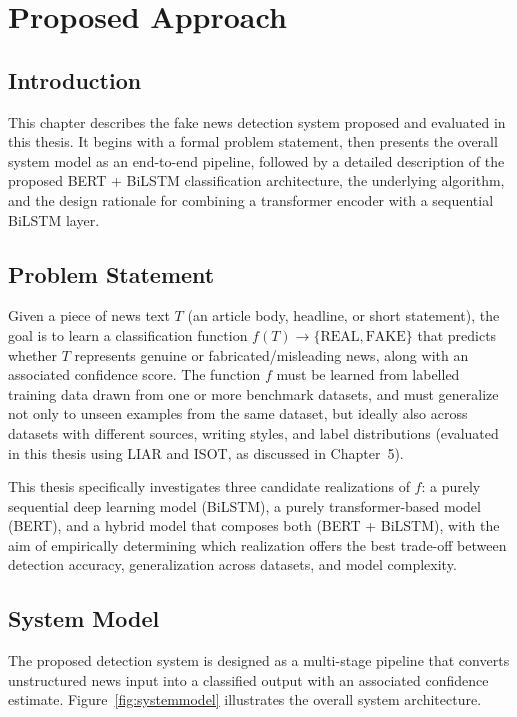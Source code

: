 \sloppy
\chapter{Proposed Approach}
\section{Introduction}

This chapter describes the fake news detection system proposed and evaluated in this thesis. It begins with a formal problem statement, then presents the overall system model as an end-to-end pipeline, followed by a detailed description of the proposed BERT + BiLSTM classification architecture, the underlying algorithm, and the design rationale for combining a transformer encoder with a sequential BiLSTM layer.

\section{Problem Statement}

Given a piece of news text $T$ (an article body, headline, or short statement), the goal is to learn a classification function $f(T) \rightarrow \{\text{REAL}, \text{FAKE}\}$ that predicts whether $T$ represents genuine or fabricated/misleading news, along with an associated confidence score. The function $f$ must be learned from labelled training data drawn from one or more benchmark datasets, and must generalize not only to unseen examples from the same dataset, but ideally also across datasets with different sources, writing styles, and label distributions (evaluated in this thesis using LIAR and ISOT, as discussed in Chapter~5).

This thesis specifically investigates three candidate realizations of $f$: a purely sequential deep learning model (BiLSTM), a purely transformer-based model (BERT), and a hybrid model that composes both (BERT + BiLSTM), with the aim of empirically determining which realization offers the best trade-off between detection accuracy, generalization across datasets, and model complexity.

\section{System Model}

The proposed detection system is designed as a multi-stage pipeline that converts unstructured news input into a classified output with an associated confidence estimate. Figure~\ref{fig:systemmodel} illustrates the overall system architecture.

